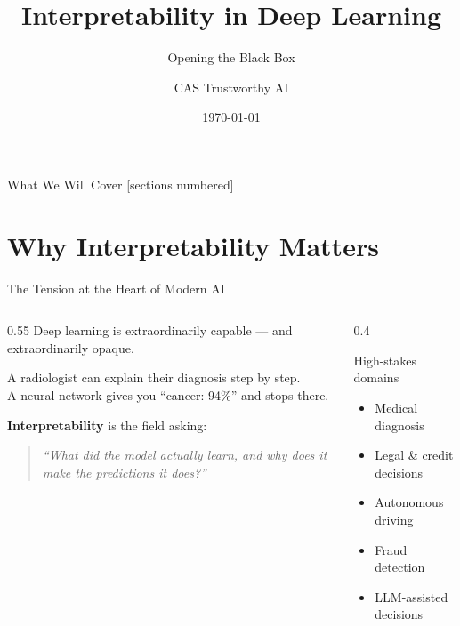\documentclass[aspectratio=169]{beamer}
\title{Interpretability in Deep Learning}
\subtitle{Opening the Black Box}
\author{CAS Trustworthy AI}
\institute{ETH Zürich}
\date{\today}
\begin{document}

\maketitle

\begin{frame}{What We Will Cover}
  [sections numbered]
  \tableofcontents
\end{frame}

\section{Why Interpretability Matters}

\begin{frame}{The Tension at the Heart of Modern AI}
  \begin{columns}[T]
    \begin{column}{0.55\textwidth}
      Deep learning is extraordinarily capable — \alert{and extraordinarily opaque}.

      \vspace{0.8em}
      A radiologist can explain their diagnosis step by step.\\
      A neural network gives you ``cancer: 94\%'' and stops there.

      \vspace{0.8em}
      \textbf{Interpretability} is the field asking:
      \begin{quote}
        \itshape ``What did the model \emph{actually} learn, and why does it make
        the predictions it does?''
      \end{quote}
    \end{column}
    \begin{column}{0.4\textwidth}
      \begin{block}{High-stakes domains}
        \begin{itemize}
          \item[\faHeartbeat] Medical diagnosis
          \item[\faBalanceScale] Legal \& credit decisions
          \item[\faCar] Autonomous driving
          \item[\faShieldAlt] Fraud detection
          \item[\faRobot] LLM-assisted decisions
        \end{itemize}
      \end{block}
    \end{column}
  \end{columns}
\end{frame}
\end{document}
